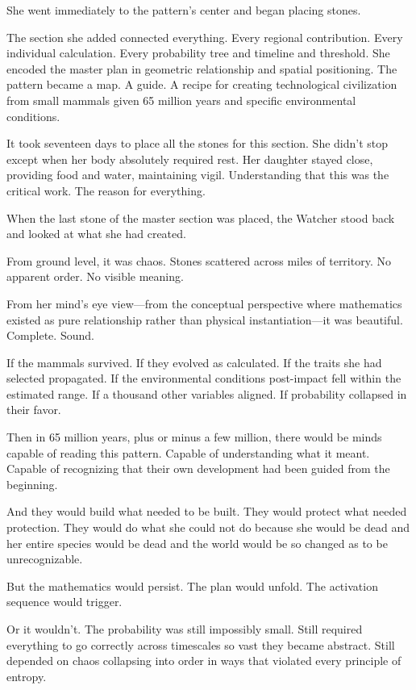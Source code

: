 She went immediately to the pattern's center and began placing stones.

The section she added connected everything. Every regional contribution. Every individual calculation. Every probability tree and timeline and threshold. She encoded the master plan in geometric relationship and spatial positioning. The pattern became a map. A guide. A recipe for creating technological civilization from small mammals given 65 million years and specific environmental conditions.

It took seventeen days to place all the stones for this section. She didn't stop except when her body absolutely required rest. Her daughter stayed close, providing food and water, maintaining vigil. Understanding that this was the critical work. The reason for everything.

When the last stone of the master section was placed, the Watcher stood back and looked at what she had created.

From ground level, it was chaos. Stones scattered across miles of territory. No apparent order. No visible meaning.

From her mind's eye view—from the conceptual perspective where mathematics existed as pure relationship rather than physical instantiation—it was beautiful. Complete. Sound.

If the mammals survived. If they evolved as calculated. If the traits she had selected propagated. If the environmental conditions post-impact fell within the estimated range. If a thousand other variables aligned. If probability collapsed in their favor.

Then in 65 million years, plus or minus a few million, there would be minds capable of reading this pattern. Capable of understanding what it meant. Capable of recognizing that their own development had been guided from the beginning.

And they would build what needed to be built. They would protect what needed protection. They would do what she could not do because she would be dead and her entire species would be dead and the world would be so changed as to be unrecognizable.

But the mathematics would persist. The plan would unfold. The activation sequence would trigger.

Or it wouldn't. The probability was still impossibly small. Still required everything to go correctly across timescales so vast they became abstract. Still depended on chaos collapsing into order in ways that violated every principle of entropy.

